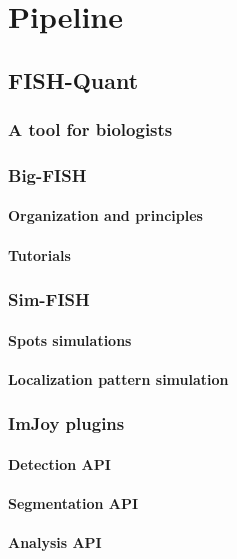 
\graphicspath{{../../figures/chapter_1/}}

\part{Pipeline}
\chapter{FISH-Quant} \label{chap:chapter_1}
\minitoc
\newpage


\section{A tool for biologists}


\section{Big-FISH}


\subsection{Organization and principles}

\subsection{Tutorials}


\section{Sim-FISH}


\subsection{Spots simulations}

\subsection{Localization pattern simulation}


\section{ImJoy plugins}


\subsection{Detection API}

\subsection{Segmentation API}

\subsection{Analysis API}
